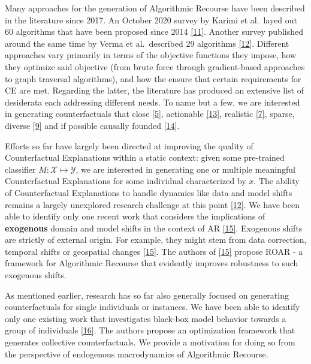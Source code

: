 \documentclass[
  conference]{IEEEtran}
\begin{document}
Many approaches for the generation of Algorithmic Recourse have been
described in the literature since 2017. An October 2020 survey by Karimi
et al.~layed out 60 algorithms that have been proposed since 2014
\protect\hyperlink{ref-karimi2020survey}{{[}11{]}}. Another survey
published around the same time by Verma et al.~described 29 algorithms
\protect\hyperlink{ref-verma2020counterfactual}{{[}12{]}}. Different
approaches vary primarily in terms of the objective functions they
impose, how they optimize said objective (from brute force through
gradient-based approaches to graph traversal algorithms), and how the
ensure that certain requirements for CE are met. Regarding the latter,
the literature has produced an extensive list of desiderata each
addressing different needs. To name but a few, we are interested in
generating counterfactuals that close
\protect\hyperlink{ref-wachter2017counterfactual}{{[}5{]}}, actionable
\protect\hyperlink{ref-ustun2019actionable}{{[}13{]}}, realistic
\protect\hyperlink{ref-schut2021generating}{{[}7{]}}, sparse, diverse
\protect\hyperlink{ref-mothilal2020explaining}{{[}9{]}} and if possible
causally founded
\protect\hyperlink{ref-karimi2021algorithmic}{{[}14{]}}.

Efforts so far have largely been directed at improving the quality of
Counterfactual Explanations within a static context: given some
pre-trained classifier \(M: \mathcal{X} \mapsto \mathcal{Y}\), we are
interested in generating one or multiple meaningful Counterfactual
Explanations for some individual characterized by \(x\). The ability of
Counterfactual Explanations to handle dynamics like data and model
shifts remains a largely unexplored research challenge at this point
\protect\hyperlink{ref-verma2020counterfactual}{{[}12{]}}. We have been
able to identify only one recent work that considers the implications of
\textbf{exogenous} domain and model shifts in the context of AR
\protect\hyperlink{ref-upadhyay2021towards}{{[}15{]}}. Exogenous shifts
are strictly of external origin. For example, they might stem from data
correction, temporal shifts or geospatial changes
\protect\hyperlink{ref-upadhyay2021towards}{{[}15{]}}. The authors of
\protect\hyperlink{ref-upadhyay2021towards}{{[}15{]}} propose ROAR - a
framework for Algorithmic Recourse that evidently improves robustness to
such exogenous shifts.

As mentioned earlier, research has so far also generally focused on
generating counterfactuals for single individuals or instances. We have
been able to identify only one existing work that investigates black-box
model behavior towards a group of individuals
\protect\hyperlink{ref-carrizosa2021generating}{{[}16{]}}. The authors
propose an optimization framework that generates collective
counterfactuals. We provide a motivation for doing so from the
perspective of endogenous macrodynamics of Algorithmic Recourse.
\end{document}
